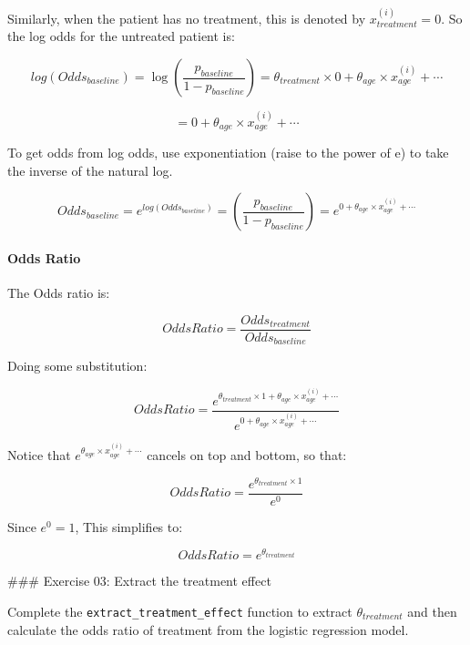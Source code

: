 \documentclass[11pt]{article}
\begin{document}
Similarly, when the patient has no treatment, this is denoted by
\(x_{treatment}^{(i)} = 0\). So the log odds for the untreated patient
is:

\[log(Odds_{baseline}) = \log \left(\frac{p_{baseline}}{1-p_{baseline}} \right) = \theta_{treatment} \times 0 + \theta_{age} \times x_{age}^{(i)} + \cdots\]

\[ = 0 + \theta_{age} \times x_{age}^{(i)} + \cdots\]

To get odds from log odds, use exponentiation (raise to the power of e)
to take the inverse of the natural log.

\[Odds_{baseline} = e^{log(Odds_{baseline})} = \left(\frac{p_{baseline}}{1-p_{baseline}} \right) = e^{0 + \theta_{age} \times x_{age}^{(i)} + \cdots}\]

    \hypertarget{odds-ratio}{%
\paragraph{Odds Ratio}\label{odds-ratio}}

The Odds ratio is:

\[ OddsRatio = \frac{Odds_{treatment}}{Odds_{baseline}}\]

Doing some substitution:

\[ OddsRatio = \frac{e^{\theta_{treatment} \times 1 + \theta_{age} \times x_{age}^{(i)} + \cdots}}{e^{0 + \theta_{age} \times x_{age}^{(i)} + \cdots}}\]

Notice that \(e^{\theta_{age} \times x_{age}^{(i)} + \cdots}\) cancels
on top and bottom, so that:

\[ OddsRatio = \frac{e^{\theta_{treatment} \times 1}}{e^{0}}\]

Since \(e^{0} = 1\), This simplifies to:

\[ OddsRatio = e^{\theta_{treatment}}\]

     \#\#\# Exercise 03: Extract the treatment effect

Complete the \texttt{extract\_treatment\_effect} function to extract
\(\theta_{treatment}\) and then calculate the odds ratio of treatment
from the logistic regression model.
\end{document}
